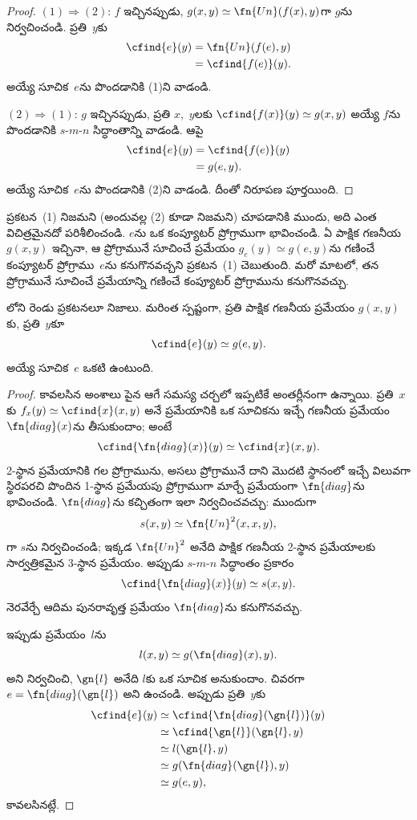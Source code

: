 \documentclass[../../../include/open-logic-section]{subfiles}
\begin{document}
\begin{proof}
$(1)\Rightarrow(2)$: $f$ ఇచ్చినప్పుడు, $g(x,y)\simeq
\fn{Un}(f(x),y)$గా $g$ను నిర్వచించండి. ప్రతి~$y$కు
\begin{align*}
\cfind{e}(y) & = \fn{Un}(f(e),y) \\
& = \cfind{f(e)}(y).
\end{align*}
అయ్యే సూచిక~$e$ను పొందడానికి (1)ని వాడండి.

$(2)\Rightarrow(1)$: $g$ ఇచ్చినప్పుడు, ప్రతి $x$,~$y$లకు
$\cfind{f(x)}(y)\simeq g(x,y)$ అయ్యే $f$ను పొందడానికి $s$-$m$-$n$
సిద్ధాంతాన్ని వాడండి. ఆపై
\begin{align*}
\cfind{e}(y) & = \cfind{f(e)}(y) \\
& = g(e,y).
\end{align*}
అయ్యే సూచిక~$e$ను పొందడానికి (2)ని వాడండి. దీంతో నిరూపణ పూర్తయింది.
\end{proof}

\begin{explain}
ప్రకటన~(1) నిజమని (అందువల్ల (2) కూడా నిజమని) చూపడానికి ముందు, అది
ఎంత విచిత్రమైనదో పరిశీలించండి. $e$ను ఒక కంప్యూటర్ ప్రోగ్రాముగా
భావించండి. ఏ పాక్షిక గణనీయ $g(x,y)$ ఇచ్చినా, ఆ ప్రోగ్రామునే సూచించే
ప్రమేయం $g_e(y)\simeq g(e,y)$ను గణించే కంప్యూటర్ ప్రోగ్రాము~$e$ను
కనుగొనవచ్చని ప్రకటన~(1) చెబుతుంది. మరో మాటలో, తన ప్రోగ్రామునే
సూచించే ప్రమేయాన్ని గణించే కంప్యూటర్ ప్రోగ్రామును కనుగొనవచ్చు.
\end{explain}

\begin{thm}
లోని రెండు ప్రకటనలూ నిజాలు. మరింత స్పష్టంగా,
ప్రతి పాక్షిక గణనీయ ప్రమేయం $g(x,y)$కు, ప్రతి~$y$కూ
\[
\cfind{e}(y) \simeq g(e,y).
\]
అయ్యే సూచిక~$e$ ఒకటి ఉంటుంది.
\end{thm}

\begin{proof}
కావలసిన అంశాలు పైన ఆగే సమస్య చర్చలో ఇప్పటికే అంతర్లీనంగా ఉన్నాయి.
ప్రతి~$x$కు $f_x(y)\simeq\cfind{x}(x,y)$ అనే ప్రమేయానికి ఒక సూచికను
ఇచ్చే గణనీయ ప్రమేయం~$\fn{diag}(x)$ను తీసుకుందాం; అంటే
\[
\cfind{\fn{diag}(x)}(y) \simeq \cfind{x}(x,y).
\]
2-స్థాన ప్రమేయానికి గల ప్రోగ్రామును, అసలు ప్రోగ్రామునే దాని మొదటి
స్థానంలో ఇచ్చే విలువగా స్థిరపరచి పొందిన 1-స్థాన ప్రమేయపు ప్రోగ్రాముగా మార్చే
ప్రమేయంగా $\fn{diag}$ను భావించండి. $\fn{diag}$ను కచ్చితంగా ఇలా
నిర్వచించవచ్చు: ముందుగా
\[
s(x,y)\simeq\fn{Un}^2(x,x,y),
\]
గా $s$ను నిర్వచించండి; ఇక్కడ $\fn{Un}^2$ అనేది పాక్షిక గణనీయ
2-స్థాన ప్రమేయాలకు సార్వత్రికమైన 3-స్థాన ప్రమేయం. అప్పుడు
$s$-$m$-$n$ సిద్ధాంతం ప్రకారం
\[
\cfind{\fn{diag}(x)}(y)\simeq s(x,y).
\]
నెరవేర్చే ఆదిమ పునరావృత్త ప్రమేయం $\fn{diag}$ను కనుగొనవచ్చు.

ఇప్పుడు ప్రమేయం~$l$ను
\[
l(x,y)\simeq g(\fn{diag}(x),y).
\]
అని నిర్వచించి, $\gn{l}$ అనేది $l$కు ఒక సూచిక అనుకుందాం. చివరగా
$e=\fn{diag}(\gn{l})$ అని ఉంచండి. అప్పుడు ప్రతి~$y$కు
\begin{align*}
\cfind{e}(y) & \simeq \cfind{\fn{diag}(\gn{l})}(y) \\
& \simeq \cfind{\gn{l}}(\gn{l}, y) \\
& \simeq l(\gn{l}, y) \\
& \simeq g(\fn{diag}(\gn{l}),y) \\
& \simeq g(e, y),
\end{align*}
కావలసినట్లే.
\end{proof}
\end{document}
